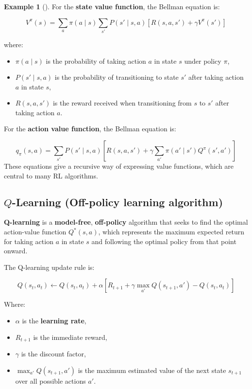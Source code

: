 \documentclass[
  letterpaper,
]{krantz}
\providecommand{\tightlist}{%
  \setlength{\itemsep}{0pt}\setlength{\parskip}{0pt}}\usepackage{longtable,booktabs,array}
\theoremstyle{plain}
\theoremstyle{definition}
\newtheorem{example}{Example}[chapter]
\theoremstyle{definition}
\theoremstyle{remark}
\begin{document}
\begin{example}[]
For the \textbf{state value function}, the Bellman equation is:

\[
V^\pi(s) = \sum_{a} \pi(a \mid s) \sum_{s'} P(s' \mid s, a) \left[ R(s, a, s') + \gamma V^\pi(s') \right]
\]

where:

\begin{itemize}
\tightlist
\item
  \(\pi(a \mid s)\) is the probability of taking action \(a\) in state
  \(s\) under policy \(\pi\),
\item
  \(P(s' \mid s, a)\) is the probability of transitioning to state
  \(s'\) after taking action \(a\) in state \(s\),
\item
  \(R(s, a, s')\) is the reward received when transitioning from \(s\)
  to \(s'\) after taking action \(a\).
\end{itemize}

For the \textbf{action value function}, the Bellman equation is:

\[
q_{\pi}(s, a) = \sum_{s'} P(s' \mid s, a) \left[ R(s, a, s') + \gamma \sum_{a'} \pi(a' \mid s') Q^\pi(s', a') \right]
\] These equations give a recursive way of expressing value functions,
which are central to many RL algorithms.

\subsection{\texorpdfstring{\(Q\)-\textbf{Learning} (Off-policy learning
algorithm)}{Q-Learning (Off-policy learning algorithm)}}\label{q-learning-off-policy-learning-algorithm}

\textbf{Q-learning} is a \textbf{model-free}, \textbf{off-policy}
algorithm that seeks to find the optimal action-value function
\(Q^*(s, a)\), which represents the maximum expected return for taking
action \(a\) in state \(s\) and following the optimal policy from that
point onward.

The Q-learning update rule is:

\[
Q(s_t, a_t) \leftarrow Q(s_t, a_t) + \alpha \left[ R_{t+1} + \gamma \max_{a'} Q(s_{t+1}, a') - Q(s_t, a_t) \right]
\]

Where:

\begin{itemize}
\tightlist
\item
  \(\alpha\) is the \textbf{learning rate},
\item
  \(R_{t+1}\) is the immediate reward,
\item
  \(\gamma\) is the discount factor,
\item
  \(\max_{a'} Q(s_{t+1}, a')\) is the maximum estimated value of the
  next state \(s_{t+1}\) over all possible actions \(a'\).
\end{itemize}


\end{example}
\end{document}

